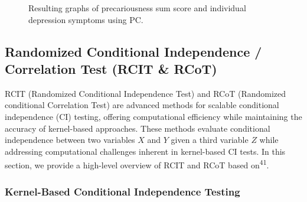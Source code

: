 \documentclass[
]{article}
\begin{document}
\begin{figure}


\caption{\label{fig-pc_presum}Resulting graphs of precariousness sum
score and individual depression symptoms using PC.}

\end{figure}%

\clearpage

\subsection{Randomized Conditional Independence / Correlation Test (RCIT
\& RCoT)}\label{sec-rcot}

RCIT (Randomized Conditional Independence Test) and RCoT (Randomized
conditional Correlation Test) are advanced methods for scalable
conditional independence (CI) testing, offering computational efficiency
while maintaining the accuracy of kernel-based approaches. These methods
evaluate conditional independence between two variables \(X\) and \(Y\)
given a third variable \(Z\) while addressing computational challenges
inherent in kernel-based CI tests. In this section, we provide a
high-level overview of RCIT and RCoT based on\textsuperscript{41}.

\subsubsection{Kernel-Based Conditional Independence
Testing}\label{kernel-based-conditional-independence-testing}
\end{document}
